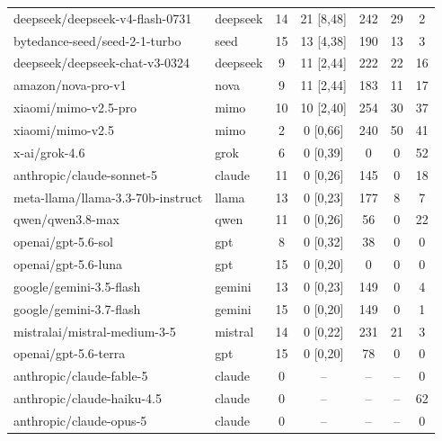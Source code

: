 \begin{tabular}{llccccc}
deepseek/deepseek-v4-flash-0731 & deepseek & 14 & 21 [8,48] & 242 & 29 & 2 \\
bytedance-seed/seed-2-1-turbo & seed & 15 & 13 [4,38] & 190 & 13 & 3 \\
deepseek/deepseek-chat-v3-0324 & deepseek & 9 & 11 [2,44] & 222 & 22 & 16 \\
amazon/nova-pro-v1 & nova & 9 & 11 [2,44] & 183 & 11 & 17 \\
xiaomi/mimo-v2.5-pro & mimo & 10 & 10 [2,40] & 254 & 30 & 37 \\
xiaomi/mimo-v2.5 & mimo & 2 & 0 [0,66] & 240 & 50 & 41 \\
x-ai/grok-4.6 & grok & 6 & 0 [0,39] & 0 & 0 & 52 \\
anthropic/claude-sonnet-5 & claude & 11 & 0 [0,26] & 145 & 0 & 18 \\
meta-llama/llama-3.3-70b-instruct & llama & 13 & 0 [0,23] & 177 & 8 & 7 \\
qwen/qwen3.8-max & qwen & 11 & 0 [0,26] & 56 & 0 & 22 \\
openai/gpt-5.6-sol & gpt & 8 & 0 [0,32] & 38 & 0 & 0 \\
openai/gpt-5.6-luna & gpt & 15 & 0 [0,20] & 0 & 0 & 0 \\
google/gemini-3.5-flash & gemini & 13 & 0 [0,23] & 149 & 0 & 4 \\
google/gemini-3.7-flash & gemini & 15 & 0 [0,20] & 149 & 0 & 1 \\
mistralai/mistral-medium-3-5 & mistral & 14 & 0 [0,22] & 231 & 21 & 3 \\
openai/gpt-5.6-terra & gpt & 15 & 0 [0,20] & 78 & 0 & 0 \\
anthropic/claude-fable-5 & claude & 0 & -- & -- & -- & 0 \\
anthropic/claude-haiku-4.5 & claude & 0 & -- & -- & -- & 62 \\
anthropic/claude-opus-5 & claude & 0 & -- & -- & -- & 0 \\
\bottomrule
\end{tabular}
